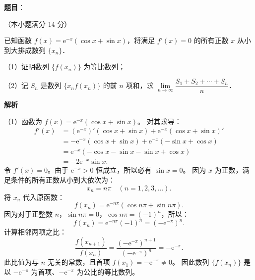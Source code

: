 \begin{answer}

\textbf{题目}：

（本小题满分 14 分）

已知函数 $f(x)=\mathrm{e}^{-x}(\cos x+\sin x)$，将满足 $f'(x)=0$ 的所有正数 $x$ 从小到大排成数列 $\{x_n\}$．

（1）证明数列 $\{f(x_n)\}$ 为等比数列；

（2）记 $S_n$ 是数列 $\{x_n f(x_n)\}$ 的前 $n$ 项和，求 $\lim\limits_{n\to\infty}\dfrac{S_1+S_2+\cdots+S_n}{n}$．

\textbf{解析}

（1）函数为 $f(x)=\mathrm{e}^{-x}(\cos x+\sin x)$。
对其求导：
\nopagebreak[4]
\[
\begin{aligned}
f'(x)&=(\mathrm{e}^{-x})'(\cos x+\sin x)+\mathrm{e}^{-x}(\cos x+\sin x)'\\
&=-\mathrm{e}^{-x}(\cos x+\sin x)+\mathrm{e}^{-x}(-\sin x+\cos x)\\
&=\mathrm{e}^{-x}(-\cos x-\sin x-\sin x+\cos x)\\
&=-2\mathrm{e}^{-x}\sin x.
\end{aligned}
\]
令 $f'(x)=0$。由于 $\mathrm{e}^{-x}>0$ 恒成立，所以必有 $\sin x=0$。
因为 $x$ 为正数，满足条件的所有正数从小到大依次为：
\nopagebreak[4]
\[
x_n=n\pi\quad (n=1,2,3,\dots).
\]
将 $x_n$ 代入原函数：
\nopagebreak[4]
\[
f(x_n)=\mathrm{e}^{-n\pi}(\cos n\pi+\sin n\pi).
\]
因为对于正整数 $n$，$\sin n\pi=0$，$\cos n\pi=(-1)^n$，所以：
\nopagebreak[4]
\[
f(x_n)=\mathrm{e}^{-n\pi}(-1)^n=(-\mathrm{e}^{-\pi})^n.
\]
计算相邻两项之比：
\nopagebreak[4]
\[
\frac{f(x_{n+1})}{f(x_n)}=\frac{(-\mathrm{e}^{-\pi})^{n+1}}{(-\mathrm{e}^{-\pi})^n}=-\mathrm{e}^{-\pi}.
\]
此比值为与 $n$ 无关的常数，且首项 $f(x_1)=-\mathrm{e}^{-\pi}\neq 0$。
因此数列 $\{f(x_n)\}$ 是以 $-\mathrm{e}^{-\pi}$ 为首项、$-\mathrm{e}^{-\pi}$ 为公比的等比数列。


\end{answer}
